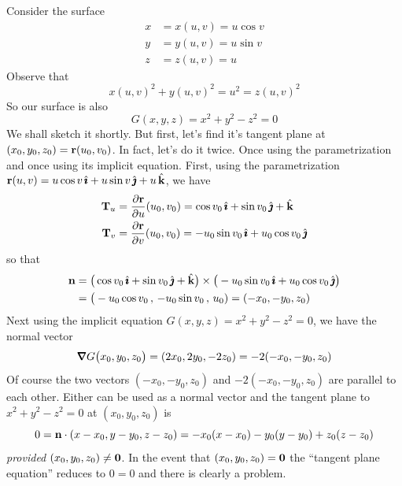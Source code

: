 \begin{eg}\label{eg:tangentPlaneA}
Consider the surface
\begin{align*}
x &= x(u,v) = u\cos v \\
y &=y(u,v) = u\sin v \\
z &=z(u,v) = u 
\end{align*}
Observe that
\begin{equation*}
x(u,v)^2 + y(u,v)^2 = u^2 = z(u,v)^2
\end{equation*}
So our surface is also
\begin{equation*}
G(x,y,z) = x^2+y^2-z^2 = 0
\end{equation*}
We shall sketch it shortly. But first, let's find it's tangent plane
at $(x_0,y_0,z_0)=\mathbf{r}(u_0,v_0)$.
In fact, let's do it twice. Once using the parametrization and once using its
implicit equation. First, using the parametrization 
$\mathbf{r}(u,v) = u\cos v\,\hat{\pmb{\imath}} + u\sin v\,\hat{\pmb{\jmath}} + u\,\hat{\mathbf{k}}$, we have
\begin{align*}
\mathbf{T}_u &= \frac{\partial\mathbf{r}}{\partial u}(u_0,v_0)
       =  \cos v_0\,\hat{\pmb{\imath}} + \sin v_0\,\hat{\pmb{\jmath}} + \hat{\mathbf{k}} \\
\mathbf{T}_v &= \frac{\partial\mathbf{r}}{\partial v}(u_0,v_0)
       =  -u_0\sin v_0\,\hat{\pmb{\imath}} + u_0\cos v_0\,\hat{\pmb{\jmath}} 
\end{align*}
so that
\begin{align*}
\mathbf{n} &= \big(\cos v_0\,\hat{\pmb{\imath}} + \sin v_0\,\hat{\pmb{\jmath}} + \hat{\mathbf{k}}\big)\times 
      \big(-u_0\sin v_0\,\hat{\pmb{\imath}} + u_0\cos v_0\,\hat{\pmb{\jmath}}\big)\\
    &= \big(-u_0\cos v_0\,,\,-u_0\sin v_0\,,\, u_0)
      = (-x_0,-y_0,z_0)
\end{align*}
Next using the implicit equation $G(x,y,z) = x^2+y^2-z^2=0$, we have
the normal vector
\begin{equation*}
\vnabla G\big(x_0,y_0,z_0\big) = (2x_0,2y_0,-2z_0) =-2(-x_0,-y_0,z_0)
\end{equation*}
Of course the two vectors $(-x_0,-y_0,z_0)$ and $-2(-x_0,-y_0,z_0)$
are parallel to each other. Either can be used as a normal vector and
the tangent plane to $x^2+y^2-z^2=0$ at $(x_0,y_0,z_0)$ is
\begin{equation*}
0=\mathbf{n}\cdot(x-x_0,y-y_0,z-z_0)
 = -x_0(x-x_0)-y_0(y-y_0) + z_0(z-z_0)
\end{equation*}
\emph{provided} $(x_0,y_0,z_0)\ne \mathbf{0}$. In the event that 
$(x_0,y_0,z_0) = \mathbf{0}$ the ``tangent plane equation'' reduces to $0=0$
and there is clearly a problem. 


\end{eg}

